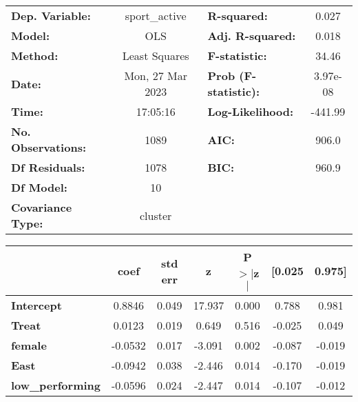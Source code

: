\begin{center}
\begin{tabular}{lclc}
\toprule
\textbf{Dep. Variable:}       &  sport\_active   & \textbf{  R-squared:         } &     0.027   \\
\textbf{Model:}               &       OLS        & \textbf{  Adj. R-squared:    } &     0.018   \\
\textbf{Method:}              &  Least Squares   & \textbf{  F-statistic:       } &     34.46   \\
\textbf{Date:}                & Mon, 27 Mar 2023 & \textbf{  Prob (F-statistic):} &  3.97e-08   \\
\textbf{Time:}                &     17:05:16     & \textbf{  Log-Likelihood:    } &   -441.99   \\
\textbf{No. Observations:}    &        1089      & \textbf{  AIC:               } &     906.0   \\
\textbf{Df Residuals:}        &        1078      & \textbf{  BIC:               } &     960.9   \\
\textbf{Df Model:}            &          10      & \textbf{                     } &             \\
\textbf{Covariance Type:}     &     cluster      & \textbf{                     } &             \\
\bottomrule
\end{tabular}
\begin{tabular}{lcccccc}
                              & \textbf{coef} & \textbf{std err} & \textbf{z} & \textbf{P$> |$z$|$} & \textbf{[0.025} & \textbf{0.975]}  \\
\midrule
\textbf{Intercept}            &       0.8846  &        0.049     &    17.937  &         0.000        &        0.788    &        0.981     \\
\textbf{Treat}                &       0.0123  &        0.019     &     0.649  &         0.516        &       -0.025    &        0.049     \\
\textbf{female}               &      -0.0532  &        0.017     &    -3.091  &         0.002        &       -0.087    &       -0.019     \\
\textbf{East}                 &      -0.0942  &        0.038     &    -2.446  &         0.014        &       -0.170    &       -0.019     \\
\textbf{low\_performing}      &      -0.0596  &        0.024     &    -2.447  &         0.014        &       -0.107    &       -0.012     \\

\end{tabular}
\end{center}
